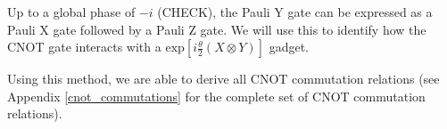 
Up to a global phase of $-i$ (CHECK), the Pauli Y gate can be expressed as a Pauli X gate followed by a Pauli Z gate. We will use this to identify how the CNOT gate interacts with a $\text{exp} [i\frac{\theta}{2} (X \otimes Y)]$ gadget.


Using this method, we are able to derive all CNOT commutation relations (see Appendix \ref{cnot_commutations} for the complete set of CNOT commutation relations).
